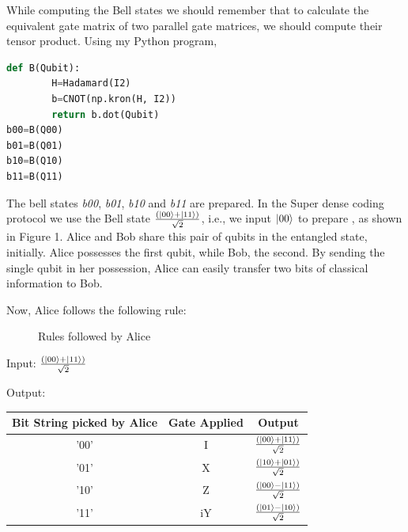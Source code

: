 \documentclass{article}
\begin{document}
While computing the Bell states we should remember that to calculate the equivalent gate matrix of two parallel gate matrices, we should compute their tensor product. Using my Python program,\\ \par
\begin{lstlisting}[language=Python, frame=single]
def B(Qubit):
        H=Hadamard(I2)
        b=CNOT(np.kron(H, I2))
        return b.dot(Qubit)
b00=B(Q00)
b01=B(Q01)
b10=B(Q10)
b11=B(Q11)
\end{lstlisting} 
The bell states \textit{b00}, \textit{b01}, \textit{b10} and \textit{b11} are prepared. In the Super dense coding protocol we use the Bell state $(\ket{00}+\ket{11}) \over \sqrt{2}$, i.e., we input $\ket{00}$  to prepare , as shown in Figure 1. Alice and Bob share this pair of qubits in the entangled state, initially. Alice possesses the first qubit, while Bob, the second. By sending the single qubit in her possession, Alice can easily transfer two bits of classical information to Bob.\\ \par
Now, Alice follows the following rule: \\  \par
\begin{figure}[H]
\centering 
\noindent{}%
\caption{Rules followed by Alice}
\end{figure}

Input: $(\ket{00}+\ket{11}) \over \sqrt{2}$\\ \par
Output:\\ \par
\begin{center}
\begin{tabular}{||c c c||}
\hline
Bit String picked by Alice & Gate Applied & Output\\[0.5ex]
\hline
\hline
'00' & I & $(\ket{00}+\ket{11}) \over \sqrt{2}$ \\
\hline
\hline
'01' & X & $(\ket{10}+\ket{01}) \over \sqrt{2}$ \\
\hline
\hline
'10' & Z & $(\ket{00}-\ket{11}) \over \sqrt{2}$ \\
\hline
\hline
'11' & iY & $(\ket{01}-\ket{10}) \over \sqrt{2}$ \\
\hline
\end{tabular}
\end{center}
\end{document}
